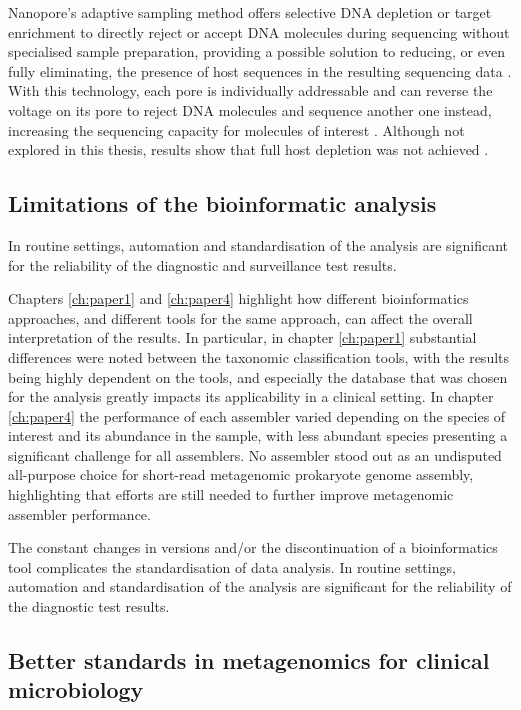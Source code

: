 Nanopore's adaptive sampling method offers selective DNA depletion or target enrichment to directly reject or accept DNA molecules during sequencing without specialised sample preparation, providing a possible solution to reducing, or even fully eliminating, the presence of host sequences in the resulting sequencing data \citep{loose_real-time_2016}. With this technology, each pore is individually addressable and can reverse the voltage on its pore to reject DNA molecules and sequence another one instead, increasing the sequencing capacity for molecules of interest \citep{loose_real-time_2016}. Although not explored in this thesis, results show that full host depletion was not achieved \citep{marquet_evaluation_2022}. 

\subsection{Limitations of the bioinformatic analysis}

In routine settings, automation and standardisation of the analysis are significant for the reliability of the diagnostic and surveillance test results. 

Chapters \ref{ch:paper1} and \ref{ch:paper4} highlight how different bioinformatics approaches, and different tools for the same approach, can affect the overall interpretation of the results. In particular, in chapter \ref{ch:paper1} substantial differences were noted between the taxonomic classification tools, with the results being highly dependent on the tools, and especially the database that was chosen for the analysis greatly impacts its applicability in a clinical setting. In chapter \ref{ch:paper4} the performance of each assembler varied depending on the species of interest and its abundance in the sample, with less abundant species presenting a significant challenge for all assemblers. No assembler stood out as an undisputed all-purpose choice for short-read metagenomic prokaryote genome assembly, highlighting that efforts are still needed to further improve metagenomic assembler performance.

The constant changes in versions and/or the discontinuation of a bioinformatics tool complicates the standardisation of data analysis. In routine settings, automation and standardisation of the analysis are significant for the reliability of the diagnostic test results.

\subsection{Better standards in metagenomics for clinical microbiology}

